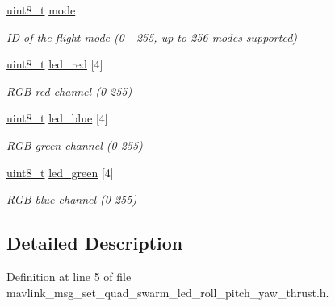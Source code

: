 \begin{DoxyCompactItemize}
\hyperlink{stdint_8h_aba7bc1797add20fe3efdf37ced1182c5}{uint8\-\_\-t} \hyperlink{struct____mavlink__set__quad__swarm__led__roll__pitch__yaw__thrust__t_ac8dd7ef2a6d82c612c439624393b8fa3}{mode}
\begin{DoxyCompactList}\small\item\em I\-D of the flight mode (0 -\/ 255, up to 256 modes supported) \end{DoxyCompactList}\item 
\hyperlink{stdint_8h_aba7bc1797add20fe3efdf37ced1182c5}{uint8\-\_\-t} \hyperlink{struct____mavlink__set__quad__swarm__led__roll__pitch__yaw__thrust__t_aef68baabcdbcddd7324ed050179643ff}{led\-\_\-red} \mbox{[}4\mbox{]}
\begin{DoxyCompactList}\small\item\em R\-G\-B red channel (0-\/255) \end{DoxyCompactList}\item 
\hyperlink{stdint_8h_aba7bc1797add20fe3efdf37ced1182c5}{uint8\-\_\-t} \hyperlink{struct____mavlink__set__quad__swarm__led__roll__pitch__yaw__thrust__t_ad4e608be5085b0e8510f9d23a7c9fa98}{led\-\_\-blue} \mbox{[}4\mbox{]}
\begin{DoxyCompactList}\small\item\em R\-G\-B green channel (0-\/255) \end{DoxyCompactList}\item 
\hyperlink{stdint_8h_aba7bc1797add20fe3efdf37ced1182c5}{uint8\-\_\-t} \hyperlink{struct____mavlink__set__quad__swarm__led__roll__pitch__yaw__thrust__t_a5a247501c5073965fa54ba787381371c}{led\-\_\-green} \mbox{[}4\mbox{]}
\begin{DoxyCompactList}\small\item\em R\-G\-B blue channel (0-\/255) \end{DoxyCompactList}\end{DoxyCompactItemize}


\subsection{Detailed Description}


Definition at line 5 of file mavlink\-\_\-msg\-\_\-set\-\_\-quad\-\_\-swarm\-\_\-led\-\_\-roll\-\_\-pitch\-\_\-yaw\-\_\-thrust.\-h.



